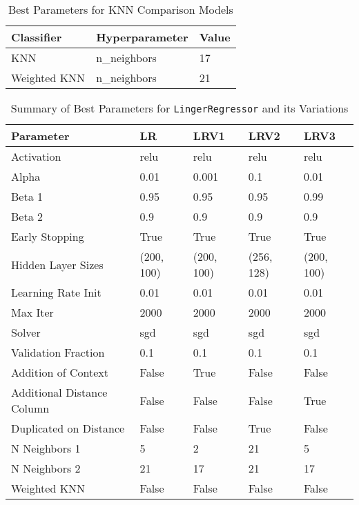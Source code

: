 \documentclass[a4paper, 12pt]{report}
\begin{document}
\begin{table}[H]
    \centering
    \caption{Best Parameters for KNN Comparison Models}
    \label{tab:best_parameters_combined_knn_exp2}
    \begin{tabular}{|l|l|l|}
    \toprule
    \textbf{Classifier} & \textbf{Hyperparameter} & \textbf{Value} \\
    \midrule
    KNN & n\_neighbors & 17 \\
    Weighted KNN & n\_neighbors & 21 \\
    \bottomrule
\end{tabular}
\end{table}

\begin{table}[H]
    \centering
    \caption{Summary of Best Parameters for \texttt{LingerRegressor} and its Variations}
    \label{tab:best_parameters_summary_exp1}
    \begin{tabular}{|l|l|l|l|l|}
    \hline
    \textbf{Parameter} & \textbf{LR} & \textbf{LRV1} & \textbf{LRV2} & \textbf{LRV3} \\
    \hline
    Activation & relu & relu & relu & relu \\
    Alpha & 0.01 & 0.001 & 0.1 & 0.01 \\
    Beta 1 & 0.95 & 0.95 & 0.95 & 0.99 \\
    Beta 2 & 0.9 & 0.9 & 0.9 & 0.9 \\
    Early Stopping & True & True & True & True \\
    Hidden Layer Sizes & (200, 100) & (200, 100) & (256, 128) & (200, 100) \\
    Learning Rate Init & 0.01 & 0.01 & 0.01 & 0.01 \\
    Max Iter & 2000 & 2000 & 2000 & 2000 \\
    Solver & sgd & sgd & sgd & sgd \\
    Validation Fraction & 0.1 & 0.1 & 0.1 & 0.1 \\
    Addition of Context & False & True & False & False \\
    Additional Distance Column & False & False & False & True \\
    Duplicated on Distance & False & False & True & False \\
    N Neighbors 1 & 5 & 2 & 21 & 5 \\
    N Neighbors 2 & 21 & 17 & 21 & 17 \\
    Weighted KNN & False & False & False & False \\
    \hline
    \end{tabular}
\end{table}
\clearpage
\end{document}
